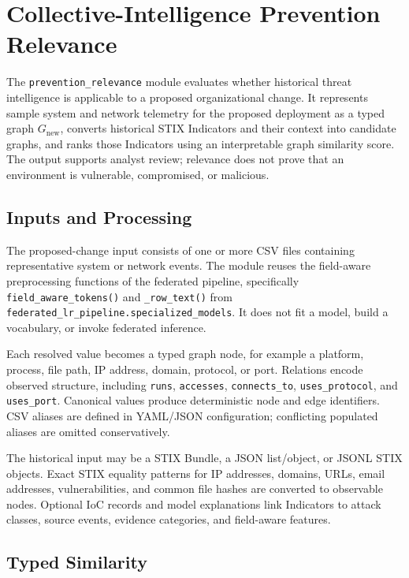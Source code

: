 \section{Collective-Intelligence Prevention Relevance}
\label{sec:prevention-relevance}

The \texttt{prevention\_relevance} module evaluates whether historical threat
intelligence is applicable to a proposed organizational change. It represents
sample system and network telemetry for the proposed deployment as a typed
graph $G_{\mathrm{new}}$, converts historical STIX Indicators and their context
into candidate graphs, and ranks those Indicators using an interpretable graph
similarity score. The output supports analyst review; relevance does not prove
that an environment is vulnerable, compromised, or malicious.

\subsection{Inputs and Processing}

The proposed-change input consists of one or more CSV files containing
representative system or network events. The module reuses the field-aware
preprocessing functions of the federated pipeline, specifically
\texttt{field\_aware\_tokens()} and \texttt{\_row\_text()} from
\texttt{federated\_lr\_pipeline.specialized\_models}. It does not fit a model,
build a vocabulary, or invoke federated inference.

Each resolved value becomes a typed graph node, for example a platform,
process, file path, IP address, domain, protocol, or port. Relations encode
observed structure, including \texttt{runs}, \texttt{accesses},
\texttt{connects\_to}, \texttt{uses\_protocol}, and \texttt{uses\_port}.
Canonical values produce deterministic node and edge identifiers. CSV aliases
are defined in YAML/JSON configuration; conflicting populated aliases are
omitted conservatively.

The historical input may be a STIX Bundle, a JSON list/object, or JSONL STIX
objects. Exact STIX equality patterns for IP addresses, domains, URLs, email
addresses, vulnerabilities, and common file hashes are converted to observable
nodes. Optional IoC records and model explanations link Indicators to attack
classes, source events, evidence categories, and field-aware features.

\subsection{Typed Similarity}

